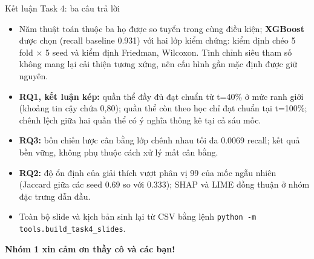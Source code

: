 \documentclass[aspectratio=169,11pt]{beamer}
\begin{document}
\begin{frame}{Kết luận Task 4: ba câu trả lời}
\begin{itemize}
  \item Năm thuật toán thuộc ba họ được so tuyển trong cùng điều kiện; \textbf{XGBoost} được chọn (recall baseline 0.931) với hai lớp kiểm chứng: kiểm định chéo 5 fold $\times$ 5 seed và kiểm định Friedman, Wilcoxon. Tinh chỉnh siêu tham số không mang lại cải thiện tương xứng, nên cấu hình gần mặc định được giữ nguyên.
  \item \textbf{RQ1, kết luận kép:} quần thể đầy đủ đạt chuẩn từ t=40\% ở mức ranh giới (khoảng tin cậy chứa 0,80); quần thể còn theo học chỉ đạt chuẩn tại t=100\%; chênh lệch giữa hai quần thể có ý nghĩa thống kê tại cả sáu mốc.
  \item \textbf{RQ3:} bốn chiến lược cân bằng lớp chênh nhau tối đa 0.0069 recall; kết quả bền vững, không phụ thuộc cách xử lý mất cân bằng.
  \item \textbf{RQ2:} độ ổn định của giải thích vượt phân vị 99 của mốc ngẫu nhiên (Jaccard giữa các seed 0.69 so với 0.333); SHAP và LIME đồng thuận ở nhóm đặc trưng dẫn đầu.
  \item Toàn bộ slide và kịch bản sinh lại từ CSV bằng lệnh \texttt{python -m tools.build\_task4\_slides}.
\end{itemize}
\vspace{2mm}
\centering\color{themecol}\textbf{Nhóm 1 xin cảm ơn thầy cô và các bạn!}
\end{frame}
\end{document}
